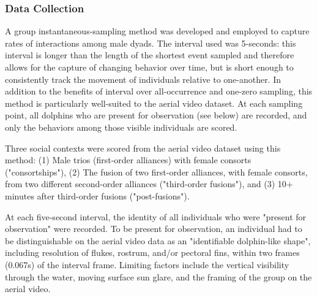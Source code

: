 \documentclass[11pt]{amsart}
\begin{document}
\subsubsection{Data Collection}
A group instantaneous-sampling method \citep{altmann:1974} was developed and employed to capture rates of interactions among male dyads. The interval used was 5-seconds: this interval is longer than the length of the shortest event sampled and therefore allows for the capture of changing behavior over time, but is short enough to consistently track the movement of individuals relative to one-another. %
In addition to the benefits of interval over all-occurrence and one-zero sampling, this method is particularly well-suited to the aerial video dataset. At each sampling point, all dolphins who are present for observation (see below) are recorded, and only the behaviors among those visible individuals are scored. %

Three social contexts were scored from the aerial video dataset using this method: (1) Male trios (first-order alliances) with female consorts ("consortships"), (2) The fusion of two first-order alliances, with female consorts, from two different second-order alliances ("third-order fusions"), and (3) 10+ minutes after third-order fusions ("post-fusions").

At each five-second interval, the identity of all individuals who were "present for observation" were recorded. To be present for observation, an individual had to be distinguishable on the aerial video data as an "identifiable dolphin-like shape", including resolution of flukes, rostrum, and/or pectoral fins, within two frames (0.067s) of the interval frame. Limiting factors include the vertical visibility through the water, moving surface sun glare, and the framing of the group on the aerial video. 
\end{document}
